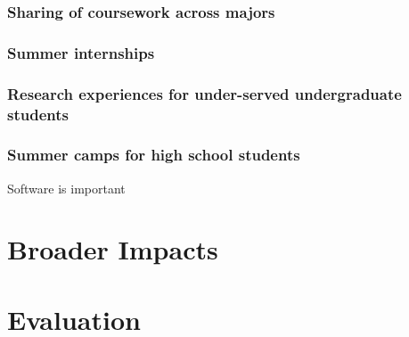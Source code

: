 \documentclass[11pt]{NSFamsart}
\begin{document}
\subsubsection*{Sharing of coursework across majors}
\subsubsection*{Summer internships} 
\subsubsection*{Research experiences for under-served undergraduate students} 
\subsubsection*{Summer camps for high school students}


Software is important \cite{RudEtal18a}

\section{Broader Impacts}
\section{Evaluation}


\newpage
\clearpage
\setcounter{page}{1}



{\renewcommand\addcontentsline[3]{} 
\renewcommand{\refname}{{\Large\textbf{References Cited}}}                   %
\renewcommand{\bibliofont}{\normalsize}

}
\end{document}

